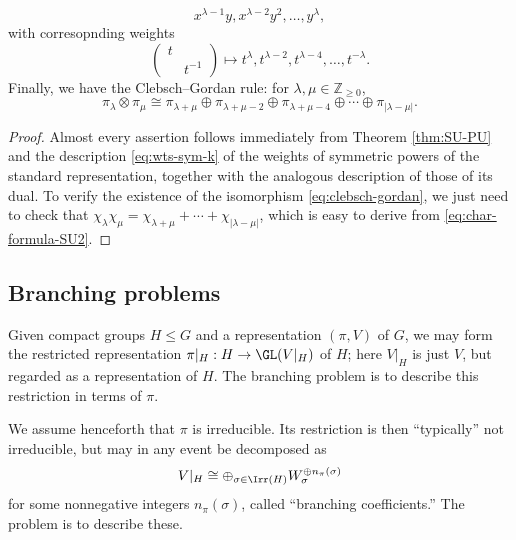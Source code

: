 \documentclass[reqno]{amsart} 
\begin{document}
\begin{theorem}
\begin{equation}
  x^{\lambda-1} y,
  x^{\lambda-2} y^2,
  \dotsc,
  y^{\lambda},
\end{equation}
with corresopnding weights
\begin{equation*}
  \begin{pmatrix}
    t &  \\
      & t^{-1}
  \end{pmatrix}
  \mapsto
  t^{\lambda}, t^{\lambda-2},
  t^{\lambda-4},
  \dotsc,
  t^{-\lambda}.
\end{equation*}
Finally, we have the Clebsch--Gordan rule: for $\lambda, \mu \in \mathbb{Z}_{\geq 0}$,
\begin{equation}\label{eq:clebsch-gordan}
  \pi_{\lambda}
  \otimes \pi_{\mu}
  \cong \pi_{\lambda+\mu}
  \oplus
  \pi_{\lambda+\mu-2}
  \oplus
  \pi_{\lambda+\mu-4}
  \oplus
  \dotsb 
  \oplus
  \pi_{|\lambda-\mu|}.
\end{equation}
\end{theorem}
\begin{proof}
  Almost every assertion follows immediately from Theorem \ref{thm:SU-PU} and the description \eqref{eq:wts-sym-k} of the weights of symmetric powers of the standard representation, together with the analogous description of those of its dual.  To verify the existence of the isomorphism \eqref{eq:clebsch-gordan}, we just need to check that $\chi_\lambda \chi_\mu = \chi_{\lambda+\mu} + \dotsb + \chi_{|\lambda-\mu|}$, which is easy to derive from \eqref{eq:char-formula-SU2}.
\end{proof}

\subsection{Branching problems}\label{sec:cnh2von9md}
Given compact groups $H \leq G$ and a representation $(\pi,V)$ of $G$, we may form the restricted representation $\pi|_{H} : H \rightarrow \GL(V|_{H})$ of $H$; here $V|_{H}$ is just $V$, but regarded as a representation of $H$.  The branching problem is to describe this restriction in terms of $\pi$.

We assume henceforth that $\pi$ is irreducible.  Its restriction is then ``typically'' not irreducible, but may in any event be decomposed as
\begin{equation*}
  V|_{H}
  \cong \oplus_{\sigma \in \Irr(H)}
  W_\sigma ^{\oplus n_\pi(\sigma)}
\end{equation*}
for some nonnegative integers $n_\pi(\sigma)$, called ``branching coefficients.''  The problem is to describe these.
\end{document}
